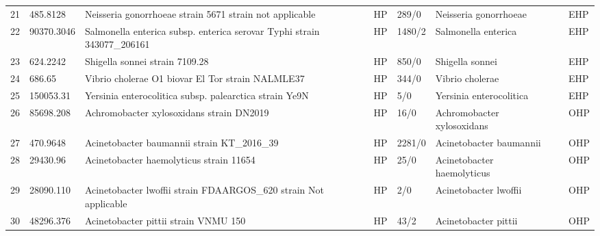 \begin{longtable}{llllllll}
21  &      485.8128 &                  Neisseria gonorrhoeae strain 5671 strain not applicable &    HP &     289/0 &                          Neisseria gonorrhoeae &                                   \cite{quillin2018neisseria} &   EHP \\
22  &    90370.3046 &  Salmonella enterica subsp. enterica serovar Typhi strain 343077\_206161 &    HP &    1480/2 &                            Salmonella enterica &                                   \cite{tanmoy2018salmonella} &   EHP \\
23  &      624.2242 &                                           Shigella sonnei strain 7109.28 &    HP &     850/0 &                                Shigella sonnei &                                       \cite{shad2020shigella} &   EHP \\
24  &        686.65 &                         Vibrio cholerae O1 biovar El Tor strain NALMLE37 &    HP &     344/0 &                                Vibrio cholerae &                                \cite{son2011characterization} &   EHP \\
25  &     150053.31 &                   Yersinia enterocolitica subsp. palearctica strain Ye9N &    HP &       5/0 &                        Yersinia enterocolitica &                                     \cite{nieckarz2020urease} &   EHP \\
26  &     85698.208 &                                 Achromobacter xylosoxidans strain DN2019 &    HP &      16/0 &                     Achromobacter xylosoxidans &                                   \cite{dai2015achromobacter} &   OHP \\
27  &      470.9648 &                              Acinetobacter baumannii strain KT\_2016\_39 &    HP &    2281/0 &                        Acinetobacter baumannii &                                \cite{howard2012acinetobacter} &   OHP \\
28  &      29430.96 &                                  Acinetobacter haemolyticus strain 11654 &    HP &      25/0 &                     Acinetobacter haemolyticus &                                   \cite{castro2020chromosome} &   OHP \\
29  &     28090.110 &         Acinetobacter lwoffii strain FDAARGOS\_620 strain Not applicable &    HP &       2/0 &                          Acinetobacter lwoffii &                              \cite{regalado2009acinetobacter} &   OHP \\
30  &     48296.376 &                                     Acinetobacter pittii strain VNMU 150 &    HP &      43/2 &                           Acinetobacter pittii &                                       \cite{espinal2012rapid} &   OHP \\

\end{longtable}
